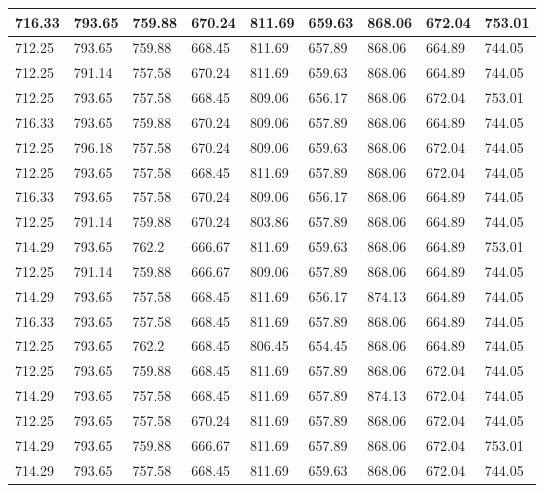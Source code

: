 \begin{longtable}{|l|l|l|l|l|l|l|l|l|}
		716.33   & 793.65  & 759.88  & 670.24  & 811.69 & 659.63  & 868.06   & 672.04  & 753.01  \\ \hline
		712.25   & 793.65  & 759.88  & 668.45  & 811.69 & 657.89  & 868.06   & 664.89  & 744.05  \\ \hline
		712.25   & 791.14  & 757.58  & 670.24  & 811.69 & 659.63  & 868.06   & 664.89  & 744.05  \\ \hline
		712.25   & 793.65  & 757.58  & 668.45  & 809.06 & 656.17  & 868.06   & 672.04  & 753.01  \\ \hline
		716.33   & 793.65  & 759.88  & 670.24  & 809.06 & 657.89  & 868.06   & 664.89  & 744.05  \\ \hline
		712.25   & 796.18  & 757.58  & 670.24  & 809.06 & 659.63  & 868.06   & 672.04  & 744.05  \\ \hline
		712.25   & 793.65  & 757.58  & 668.45  & 811.69 & 657.89  & 868.06   & 672.04  & 744.05  \\ \hline
		716.33   & 793.65  & 757.58  & 670.24  & 809.06 & 656.17  & 868.06   & 664.89  & 744.05  \\ \hline
		712.25   & 791.14  & 759.88  & 670.24  & 803.86 & 657.89  & 868.06   & 664.89  & 744.05  \\ \hline
		714.29   & 793.65  & 762.2   & 666.67  & 811.69 & 659.63  & 868.06   & 664.89  & 753.01  \\ \hline
		712.25   & 791.14  & 759.88  & 666.67  & 809.06 & 657.89  & 868.06   & 664.89  & 744.05  \\ \hline
		714.29   & 793.65  & 757.58  & 668.45  & 811.69 & 656.17  & 874.13   & 664.89  & 744.05  \\ \hline
		716.33   & 793.65  & 757.58  & 668.45  & 811.69 & 657.89  & 868.06   & 664.89  & 744.05  \\ \hline
		712.25   & 793.65  & 762.2   & 668.45  & 806.45 & 654.45  & 868.06   & 664.89  & 744.05  \\ \hline
		712.25   & 793.65  & 759.88  & 668.45  & 811.69 & 657.89  & 868.06   & 672.04  & 744.05  \\ \hline
		714.29   & 793.65  & 757.58  & 668.45  & 811.69 & 657.89  & 874.13   & 672.04  & 744.05  \\ \hline
		712.25   & 793.65  & 757.58  & 670.24  & 811.69 & 657.89  & 868.06   & 672.04  & 744.05  \\ \hline
		714.29   & 793.65  & 759.88  & 666.67  & 811.69 & 657.89  & 868.06   & 672.04  & 753.01  \\ \hline
		714.29   & 793.65  & 757.58  & 668.45  & 811.69 & 659.63  & 868.06   & 672.04  & 744.05  \\ \hline

\end{longtable}
